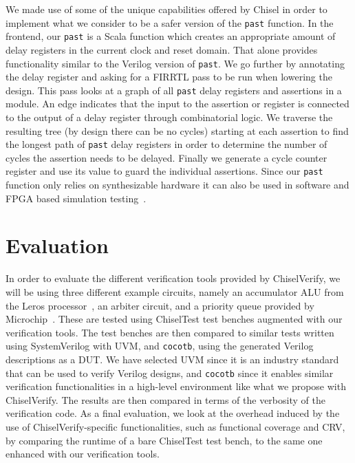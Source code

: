 \documentclass[conference]{IEEEtran}
\newcommand{\code}[1]{{\small{\texttt{#1}}}}
\begin{document}
We made use of some of the unique capabilities offered by Chisel in order to implement what we consider to be a safer version of the
\code{past} function.
In the frontend, our \code{past} is a Scala function which creates an appropriate amount of delay registers in the current
clock and reset domain. That alone provides functionality similar to the Verilog version of \code{past}.
We go further by annotating the delay register and asking for a FIRRTL pass to be run when lowering the design.
This pass looks at a graph of all \code{past} delay registers and assertions in a module.
An edge indicates that the input to the assertion or register is connected to the output of a delay register through combinatorial logic.
We traverse the resulting tree (by design there can be no cycles) starting at each assertion
to find the longest path of \code{past} delay registers in order to determine the number of cycles the assertion needs to be delayed.
Finally we generate a cycle counter register and use its value to guard the individual assertions.
Since our \code{past} function only relies on synthesizable hardware it can also be used in software and FPGA based
simulation testing~\cite{karandikar2018firesim}.


\section{Evaluation}
\label{sec:eval}

In order to evaluate the different verification tools provided by ChiselVerify, we will be using three different example circuits, namely an accumulator ALU from the Leros processor~\cite{leros:arcs2019}, an arbiter circuit, and a priority queue provided by Microchip~\cite{microchip}.
These are tested using ChiselTest test benches augmented with our verification tools.
The test benches are then compared to similar tests written using SystemVerilog with UVM, and \texttt{cocotb}, using the generated Verilog descriptions as a DUT.
We have selected UVM since it is an industry standard that can be used to verify Verilog designs, and \texttt{cocotb} since it enables similar verification functionalities in a high-level environment like what we propose with ChiselVerify.
The results are then compared in terms of the verbosity of the verification code.
As a final evaluation, we look at the overhead induced by the use of ChiselVerify-specific functionalities, such as functional coverage and CRV, by comparing the runtime of a bare ChiselTest test bench, to the same one enhanced with our verification tools.
\end{document}
